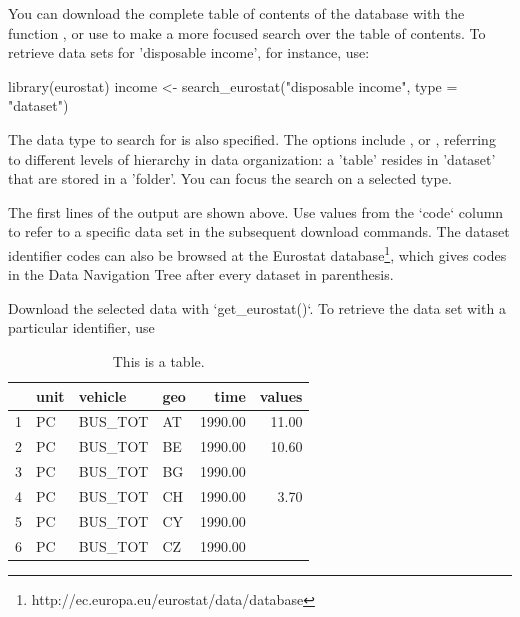 

You can download the complete table of contents of the database with the function , or use  to make a more focused search over the table of contents. To retrieve data sets for 'disposable income', for instance, use:

\begin{example}
library(eurostat)
income <- search_eurostat("disposable income", type = "dataset")
\end{example}

The data type to search for is also specified. The options include ,  or , referring to different levels of hierarchy in data organization: a 'table' resides in 'dataset' that are stored in a 'folder'. You can focus the search on a selected type.

The first lines of the output are shown above. Use values from the `code` column to refer to a specific data set in the subsequent download commands. The dataset identifier codes can also be browsed at the Eurostat
database\footnote{http://ec.europa.eu/eurostat/data/database}, which gives
codes in the Data Navigation Tree after every dataset in parenthesis.

Download the selected data with `get\_eurostat()`. To retrieve the data set with a particular identifier, use 

\begin{example}
\end{example}



\begin{table}[ht]
\centering
\begin{tabular}{rlllrr}
  \hline
 & unit & vehicle & geo & time & values \\ 
  \hline
1 & PC & BUS\_TOT & AT & 1990.00 & 11.00 \\ 
  2 & PC & BUS\_TOT & BE & 1990.00 & 10.60 \\ 
  3 & PC & BUS\_TOT & BG & 1990.00 &  \\ 
  4 & PC & BUS\_TOT & CH & 1990.00 & 3.70 \\ 
  5 & PC & BUS\_TOT & CY & 1990.00 &  \\ 
  6 & PC & BUS\_TOT & CZ & 1990.00 &  \\ 
   \hline
\end{tabular}
\caption{This is a table.} 
\label{tab:getdatatable}
\end{table}

